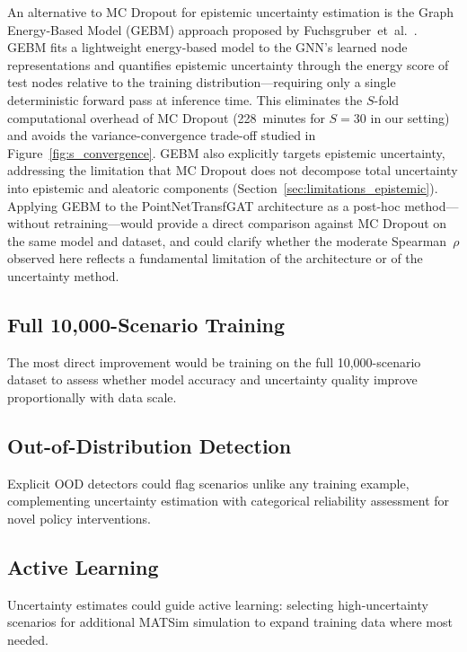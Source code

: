An alternative to MC Dropout for epistemic uncertainty estimation is the Graph Energy-Based Model (GEBM) approach proposed by Fuchsgruber~et~al.~\cite{fuchsgruber2024energy}. GEBM fits a lightweight energy-based model to the GNN's learned node representations and quantifies epistemic uncertainty through the energy score of test nodes relative to the training distribution---requiring only a single deterministic forward pass at inference time. This eliminates the $S$-fold computational overhead of MC Dropout (228~minutes for $S = 30$ in our setting) and avoids the variance-convergence trade-off studied in Figure~\ref{fig:s_convergence}. GEBM also explicitly targets epistemic uncertainty, addressing the limitation that MC Dropout does not decompose total uncertainty into epistemic and aleatoric components (Section~\ref{sec:limitations_epistemic}). Applying GEBM to the PointNetTransfGAT architecture as a post-hoc method---without retraining---would provide a direct comparison against MC Dropout on the same model and dataset, and could clarify whether the moderate Spearman~$\rho$ observed here reflects a fundamental limitation of the architecture or of the uncertainty method.

\subsection{Full 10,000-Scenario Training}

The most direct improvement would be training on the full 10,000-scenario dataset to assess whether model accuracy and uncertainty quality improve proportionally with data scale.

\subsection{Out-of-Distribution Detection}

Explicit OOD detectors could flag scenarios unlike any training example, complementing uncertainty estimation with categorical reliability assessment for novel policy interventions.

\subsection{Active Learning}

Uncertainty estimates could guide active learning: selecting high-uncertainty scenarios for additional MATSim simulation to expand training data where most needed.
